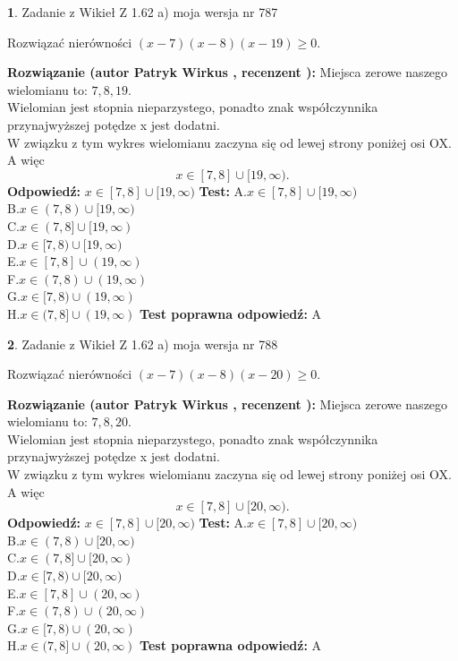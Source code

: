 \documentclass[12pt, a4paper]{article}
\theoremstyle{definition} %
\newtheorem{zad}{}
\newcommand{\zadStart}[1]{\begin{zad}#1\newline}
\newcommand{\zadStop}{\end{zad}}
\newcommand{\rozwStart}[2]{\noindent \textbf{Rozwiązanie (autor #1 , recenzent #2): }\newline}
\newcommand{\rozwStop}{\newline}
\newcommand{\odpStart}{\noindent \textbf{Odpowiedź:}\newline}
\newcommand{\odpStop}{\newline}
\newcommand{\testStart}{\noindent \textbf{Test:}\newline}
\newcommand{\testStop}{\newline}
\newcommand{\kluczStart}{\noindent \textbf{Test poprawna odpowiedź:}\newline}
\newcommand{\kluczStop}{\newline}
\begin{document}
\zadStart{Zadanie z Wikieł Z 1.62 a) moja wersja nr 787}

Rozwiązać nierówności $(x-7)(x-8)(x-19)\ge0$.
\zadStop
\rozwStart{Patryk Wirkus}{}
Miejsca zerowe naszego wielomianu to: $7, 8, 19$.\\
Wielomian jest stopnia nieparzystego, ponadto znak współczynnika przy\linebreak najwyższej potędze x jest dodatni.\\ W związku z tym wykres wielomianu zaczyna się od lewej strony poniżej osi OX. A więc $$x \in [7,8] \cup [19,\infty).$$
\rozwStop
\odpStart
$x \in [7,8] \cup [19,\infty)$
\odpStop
\testStart
A.$x \in [7,8] \cup [19,\infty)$\\
B.$x \in (7,8) \cup [19,\infty)$\\
C.$x \in (7,8] \cup [19,\infty)$\\
D.$x \in [7,8) \cup [19,\infty)$\\
E.$x \in [7,8] \cup (19,\infty)$\\
F.$x \in (7,8) \cup (19,\infty)$\\
G.$x \in [7,8) \cup (19,\infty)$\\
H.$x \in (7,8] \cup (19,\infty)$
\testStop
\kluczStart
A
\kluczStop



\zadStart{Zadanie z Wikieł Z 1.62 a) moja wersja nr 788}

Rozwiązać nierówności $(x-7)(x-8)(x-20)\ge0$.
\zadStop
\rozwStart{Patryk Wirkus}{}
Miejsca zerowe naszego wielomianu to: $7, 8, 20$.\\
Wielomian jest stopnia nieparzystego, ponadto znak współczynnika przy\linebreak najwyższej potędze x jest dodatni.\\ W związku z tym wykres wielomianu zaczyna się od lewej strony poniżej osi OX. A więc $$x \in [7,8] \cup [20,\infty).$$
\rozwStop
\odpStart
$x \in [7,8] \cup [20,\infty)$
\odpStop
\testStart
A.$x \in [7,8] \cup [20,\infty)$\\
B.$x \in (7,8) \cup [20,\infty)$\\
C.$x \in (7,8] \cup [20,\infty)$\\
D.$x \in [7,8) \cup [20,\infty)$\\
E.$x \in [7,8] \cup (20,\infty)$\\
F.$x \in (7,8) \cup (20,\infty)$\\
G.$x \in [7,8) \cup (20,\infty)$\\
H.$x \in (7,8] \cup (20,\infty)$
\testStop
\kluczStart
A
\kluczStop
\end{document}
